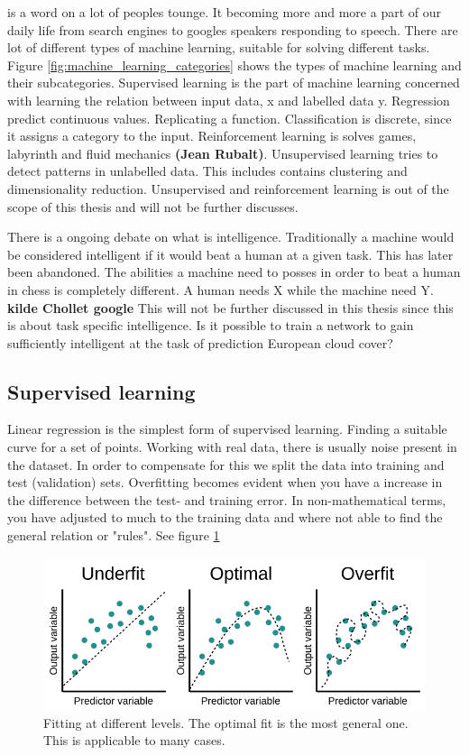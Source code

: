 is a word on a lot of peoples tounge. It becoming more and more a part of our daily life from search engines to googles speakers responding to speech. There are lot of different types of machine learning, suitable for solving different tasks. Figure \ref{fig:machine_learning_categories} shows the types of machine learning and their subcategories. Supervised learning is the part of machine learning concerned with learning the relation between input data, x and labelled data y. Regression predict continuous values. Replicating a function. Classification is discrete, since it assigns a category to the input. Reinforcement learning is solves games, labyrinth and fluid mechanics \textbf{(Jean Rubalt)}. Unsupervised learning tries to detect patterns in unlabelled data. This includes contains clustering and dimensionality reduction. Unsupervised and reinforcement learning is out of the scope of this thesis and will not be further discusses.

There is a ongoing debate on what is intelligence. Traditionally a machine would be considered intelligent if it would beat a human at a given task. This has later been abandoned. The abilities a machine need to posses in order to beat a human in chess is completely different. A human needs X while the machine need Y. \textbf{kilde Chollet google} This will not be further discussed in this thesis since this is about task specific intelligence. Is it possible to train a network to gain sufficiently intelligent at the task of prediction European cloud cover?

\subsection{Supervised learning} \label{sec:supervised_learning}
Linear regression is the simplest form of supervised learning. Finding a suitable curve for a set of points. Working with real data, there is usually noise present in the dataset. In order to compensate for this we split the data into training and test (validation) sets. Overfitting becomes evident when you have a increase in the difference between the test- and training error. In non-mathematical terms, you have adjusted to much to the training data and where not able to find the general relation or "rules". See figure \ref{fig:linreg_overfitting}

\begin{figure}[hp]
    \centering
    \includegraphics{Chapter2_Theory/images/linear_regression.png}
    \caption{Fitting at different levels. The optimal fit is the most general one. This is applicable to many cases.}
    \label{fig:linreg_overfitting}
\end{figure}

